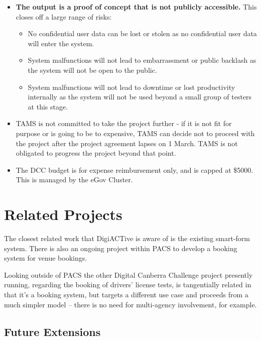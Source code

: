 \documentclass[12pt,a4paper,twosided]{article}
\begin{document}
\begin{itemize}
\itemsep1pt\parskip0pt
\item
  \textbf{The output is a proof of concept that is not publicly
  accessible.} This closes off a large range of risks:

  \begin{itemize}
  \itemsep1pt\parskip0pt
  \item
    No confidential user data can be lost or stolen as no confidential
    user data will enter the system.
  \item
    System malfunctions will not lead to embarrassment or public
    backlash as the system will not be open to the public.
  \item
    System malfunctions will not lead to downtime or lost productivity
    internally as the system will not be used beyond a small group of
    testers at this stage.
  \end{itemize}
\item
  TAMS is not committed to take the project further - if it is not fit
  for purpose or is going to be to expensive, TAMS can decide not to
  proceed with the project after the project agreement lapses on 1
  March. TAMS is not obligated to progress the project beyond that
  point.
\item
  The DCC budget is for expense reimbursement only, and is capped at
  \$5000. This is managed by the eGov Cluster.
\end{itemize}

\section{Related Projects}\label{related-projects}

The closest related work that DigiACTive is aware of is the existing
smart-form system. There is also an ongoing project within PACS to
develop a booking system for venue bookings.

Looking outside of PACS the other Digital Canberra Challenge project
presently running, regarding the booking of drivers' license tests, is
tangentially related in that it's a booking system, but targets a
different use case and proceeds from a much simpler model -- there is no
need for multi-agency involvement, for example.

\subsection{Future Extensions}\label{future-extensions}
\end{document}
